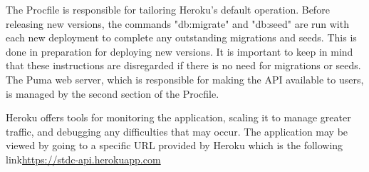\begin{justify}
    \clearpage
    \vspace{0.25cm}
    \newendline The Procfile is responsible for tailoring Heroku's default operation. Before releasing new versions, the commands "db:migrate" and "db:seed" are run with each new deployment to complete any outstanding migrations and seeds. This is done in preparation for deploying new versions. It is important to keep in mind that these instructions are disregarded if there is no need for migrations or seeds. The Puma web server, which is responsible for making the API available to users, is managed by the second section of the Procfile.

    \vspace{0.25cm}
    \newendline Heroku offers tools for monitoring the application, scaling it to manage greater traffic, and debugging any difficulties that may occur. The application may be viewed by going to a specific URL provided by Heroku which is the following link\newendline \href{https://stdc-api.herokuapp.com}{https://stdc-api.herokuapp.com}


    
\end{justify}
\clearpage



